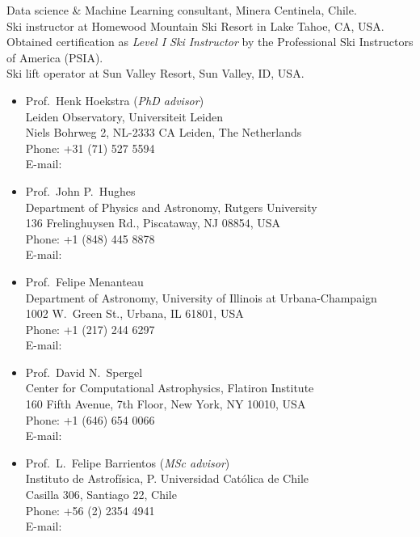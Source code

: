 \documentclass[11pt]{article}
\begin{document}



\noindent
{} Data science \& Machine Learning consultant, Minera Centinela, Chile.\\
 Ski instructor at Homewood Mountain Ski Resort in Lake 
Tahoe, CA, USA. Obtained certification as \emph{Level I Ski Instructor} by the 
Professional Ski Instructors of America (PSIA).\\
 Ski lift operator at Sun Valley Resort, Sun Valley, ID, USA.\\



\begin{itemize}
\item Prof.~Henk Hoekstra (\textit{PhD advisor})\\
      Leiden Observatory, Universiteit Leiden\\
      Niels Bohrweg 2, NL-2333 CA Leiden, The Netherlands\\
      Phone: +31 (71) 527 5594\\
      E-mail: 
\item Prof.~John P.~Hughes\\
      Department of Physics and Astronomy, Rutgers University\\
      136 Frelinghuysen Rd., Piscataway, NJ 08854, USA\\
      Phone: +1 (848) 445 8878\\
      E-mail: 
\item Prof.~Felipe Menanteau\\
      Department of Astronomy, University of Illinois at Urbana-Champaign\\
      1002 W.\ Green St., Urbana, IL 61801, USA\\
      Phone: +1 (217) 244 6297\\
      E-mail: 
\item Prof.~David N.~Spergel\\
      Center for Computational Astrophysics, Flatiron Institute\\
      160 Fifth Avenue, 7th Floor, New York, NY 10010, USA\\
      Phone: +1 (646) 654 0066\\
      E-mail: 
\item Prof.~L.~Felipe Barrientos (\textit{MSc advisor})\\
      Instituto de Astrof\'isica, P. Universidad Cat\'olica de Chile\\
      Casilla 306, Santiago 22, Chile\\
      Phone: +56 (2) 2354 4941\\
      E-mail: 
\end{itemize}
\end{document}
